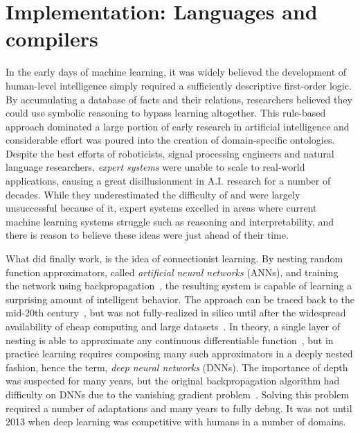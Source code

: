 \documentclass[12pt,initial,twoside,maitrise]{dms}
\numberwithin{equation}{section}
\numberwithin{table}{chapter}
\numberwithin{figure}{chapter}
\begin{document}
\section{Implementation: Languages and compilers}

In the early days of machine learning, it was widely believed the development of human-level intelligence simply required a sufficiently descriptive first-order logic. By accumulating a database of facts and their relations, researchers believed they could use symbolic reasoning to bypass learning altogether. This rule-based approach dominated a large portion of early research in artificial intelligence and considerable effort was poured into the creation of domain-specific ontologies. Despite the best efforts of roboticists, signal processing engineers and natural language researchers, \textit{expert systems} were unable to scale to real-world applications, causing a great disillusionment in A.I. research for a number of decades. While they underestimated the difficulty of  and were largely unsuccessful because of it, expert systems excelled in areas where current machine learning systems struggle such as reasoning and interpretability, and there is reason to believe these ideas were just ahead of their time.

What did finally work, is the idea of connectionist learning. By nesting random function approximators, called \textit{artificial neural networks} (ANNs), and training the network using backpropagation~\cite{werbos1990backpropagation, rumelhart1988learning}, the resulting system is capable of learning a surprising amount of intelligent behavior. The approach can be traced back to the mid-20th century~\cite{ivakhnenko1965cybernetic, rosenblatt1958perceptron}, but was not fully-realized in silico until after the widespread availability of cheap computing and large datasets~\cite{lecun2015deep}. In theory, a single layer of nesting is able to approximate any continuous differentiable function~\cite{hornik1989multilayer}, but in practice learning requires composing many such approximators in a deeply nested fashion, hence the term, \textit{deep neural networks} (DNNs). The importance of depth was suspected for many years, but the original backpropagation algorithm had difficulty on DNNs due to the vanishing gradient problem~\cite{bengio1994learning}. Solving this problem required a number of adaptations and many years to fully debug. It was not until 2013 when deep learning was competitive with humans in a number of domains.
\end{document}
